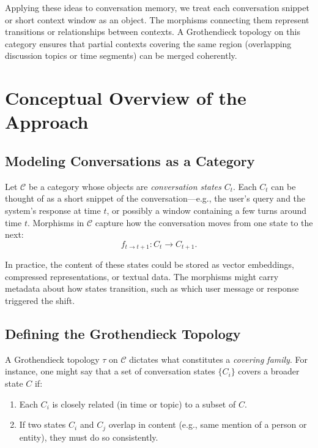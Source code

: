 \documentclass{article}
\begin{document}
Applying these ideas to conversation memory, we treat each conversation snippet or short context window as an object. The morphisms connecting them represent transitions or relationships between contexts. A Grothendieck topology on this category ensures that partial contexts covering the same region (overlapping discussion topics or time segments) can be merged coherently.

\section{Conceptual Overview of the Approach}
\label{sec:conceptual_overview}

\subsection{Modeling Conversations as a Category}

Let \(\mathcal{C}\) be a category whose objects are \emph{conversation states} \(C_t\). Each \(C_t\) can be thought of as a short snippet of the conversation—e.g., the user’s query and the system’s response at time \(t\), or possibly a window containing a few turns around time \(t\). Morphisms in \(\mathcal{C}\) capture how the conversation moves from one state to the next:
\[
    f_{t \to t+1}: C_t \longrightarrow C_{t+1}.
\]

In practice, the content of these states could be stored as vector embeddings, compressed representations, or textual data. The morphisms might carry metadata about how states transition, such as which user message or response triggered the shift.

\subsection{Defining the Grothendieck Topology}
\label{subsec:groth_topology}

A Grothendieck topology \(\tau\) on \(\mathcal{C}\) dictates what constitutes a \emph{covering family}. For instance, one might say that a set of conversation states \(\{C_i\}\) covers a broader state \(C\) if:
\begin{enumerate}
    \item Each \(C_i\) is closely related (in time or topic) to a subset of \(C\).
    \item If two states \(C_i\) and \(C_j\) overlap in content (e.g., same mention of a person or entity), they must do so consistently.
\end{enumerate}
\end{document}

